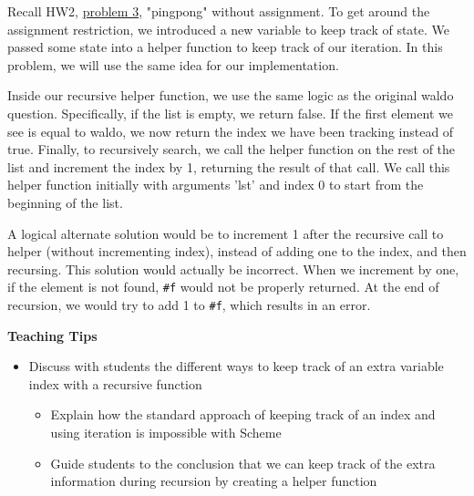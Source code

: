 \begin{blocksection}
\begin{solution}
Recall HW2, \href{https://cs61a.org/hw/sol-hw02/#q3}{problem 3}, "pingpong" without assignment. To get around the assignment restriction, we introduced a new variable to keep track of state. We passed some state into a helper function to keep track of our iteration. In this problem, we will use the same idea for our implementation.

Inside our recursive helper function, we use the same logic as the original waldo question. Specifically, if the list is empty, we return false. If the first element we see is equal to waldo, we now return the index we have been tracking instead of true. Finally, to recursively search, we call the helper function on the rest of the list and increment the index by 1, returning the result of that call. We call this helper function initially with arguments 'lst' and index 0 to start from the beginning of the list.

A logical alternate solution would be to increment 1 after the recursive call to helper (without incrementing index), instead of adding one to the index, and then recursing. This solution would actually be incorrect. When we increment by one, if the element is not found, \texttt{\#f} would not be properly returned. At the end of recursion, we would try to add 1 to \texttt{\#f}, which results in an error.
\end{solution}

\end{blocksection}

\begin{guide}
\begin{blocksection}
\textbf{Teaching Tips}
\begin{itemize}
  \item Discuss with students the different ways to keep track of an extra variable index with a recursive function
  \begin{itemize}
    \item Explain how the standard approach of keeping track of an index and using iteration is impossible with Scheme
    \item Guide students to the conclusion that we can keep track of the extra information during recursion by creating a helper function
  \end{itemize}
\end{itemize}
\end{blocksection}
\end{guide}
